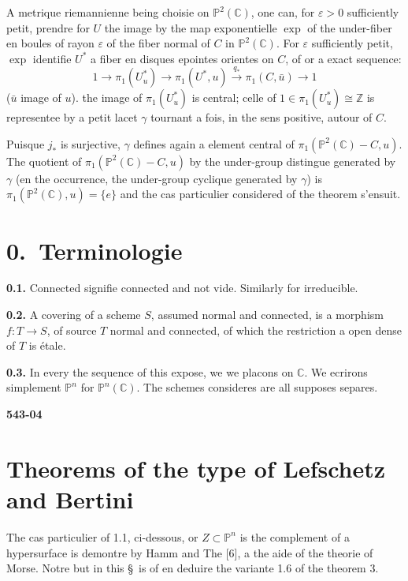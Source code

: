 \documentclass[12pt,a4paper]{article}
\newcounter{secitem}
\begin{document}
A metrique riemannienne being choisie on $\mathbb{P}^2(\mathbb{C})$, one can, for $\varepsilon > 0$ sufficiently petit, prendre for $U$ the image by the map exponentielle $\exp$ of the under-fiber en boules of rayon $\varepsilon$ of the fiber normal of $C$ in $\mathbb{P}^2(\mathbb{C})$. For $\varepsilon$ sufficiently petit, $\exp$ identifie $U^*$ a fiber en disques epointes orientes on $C$, of or a exact sequence:
\[
1 \longrightarrow \pi_1(U^*_u) \longrightarrow \pi_1(U^*, u) \xrightarrow{\;q_*\;} \pi_1(C, \bar{u}) \longrightarrow 1
\]
($\bar{u}$ image of $u$). the image of $\pi_1(U^*_u)$ is central; celle of $1 \in \pi_1(U^*_u) \cong \mathbb{Z}$ is representee by a petit lacet $\gamma$ tournant a fois, in the sens positive, autour of $C$.

Puisque $j_*$ is surjective, $\gamma$ defines again a element central of $\pi_1(\mathbb{P}^2(\mathbb{C}) - C, u)$. The quotient of $\pi_1(\mathbb{P}^2(\mathbb{C}) - C, u)$ by the under-group distingue generated by $\gamma$ (en the occurrence, the under-group cyclique generated by $\gamma$) is $\pi_1(\mathbb{P}^2(\mathbb{C}), u) = \{e\}$ and the cas particulier considered of the theorem s'ensuit.

\section*{0.\ Terminologie}

\textbf{0.1.} Connected signifie connected and not vide. Similarly for irreducible.

\textbf{0.2.} A covering of a scheme $S$, assumed normal and connected, is a morphism $f : T \to S$, of source $T$ normal and connected, of which the restriction a open dense of $T$ is étale.

\textbf{0.3.} In every the sequence of this expose, we we placons on $\mathbb{C}$. We ecrirons simplement $\mathbb{P}^n$ for $\mathbb{P}^n(\mathbb{C})$. The schemes consideres are all supposes separes.

\newpage
\begin{flushright}
\textbf{543-04}
\end{flushright}

\section{Theorems of the type of Lefschetz and Bertini}
\setcounter{secitem}{0}

The cas particulier of 1.1, ci-dessous, or $Z \subset \mathbb{P}^n$ is the complement of a hypersurface is demontre by Hamm and The [6], a the aide of the theorie of Morse. Notre but in this \S\ is of en deduire the variante 1.6 of the theorem 3.
\end{document}
